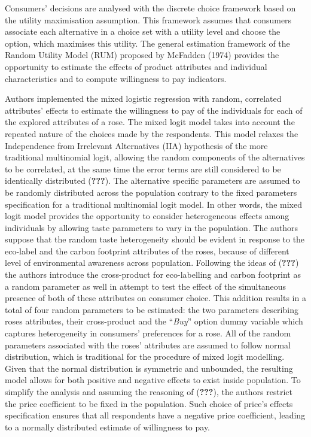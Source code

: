 \documentclass[11pt,]{article}
\begin{document}
Consumers' decisions are analysed with the discrete choice framework
based on the utility maximisation assumption. This framework assumes
that consumers associate each alternative in a choice set with a utility
level and choose the option, which maximises this utility. The general
estimation framework of the Random Utility Model (RUM) proposed by
McFadden (1974) provides the opportunity to estimate the effects of
product attributes and individual characteristics and to compute
willingness to pay indicators.

Authors implemented the mixed logistic regression with random,
correlated attributes' effects to estimate the willingness to pay of the
individuals for each of the explored attributes of a rose. The mixed
logit model takes into account the repeated nature of the choices made
by the respondents. This model relaxes the Independence from Irrelevant
Alternatives (IIA) hypothesis of the more traditional multinomial logit,
allowing the random components of the alternatives to be correlated, at
the same time the error terms are still considered to be identically
distributed ({\textbf{???}}). The alternative specific parameters are
assumed to be randomly distributed across the population contrary to the
fixed parameters specification for a traditional multinomial logit
model. In other words, the mixed logit model provides the opportunity to
consider heterogeneous effects among individuals by allowing taste
parameters to vary in the population. The authors suppose that the
random taste heterogeneity should be evident in response to the
eco-label and the carbon footprint attributes of the roses, because of
different level of environmental awareness across population. Following
the ideas of ({\textbf{???}}) the authors introduce the cross-product
for eco-labelling and carbon footprint as a random parameter as well in
attempt to test the effect of the simultaneous presence of both of these
attributes on consumer choice. This addition results in a total of four
random parameters to be estimated: the two parameters describing roses
attributes, their cross-product and the ``\emph{Buy}'' option dummy
variable which captures heterogeneity in consumers' preferences for a
rose. All of the random parameters associated with the roses' attributes
are assumed to follow normal distribution, which is traditional for the
procedure of mixed logit modelling. Given that the normal distribution
is symmetric and unbounded, the resulting model allows for both positive
and negative effects to exist inside population. To simplify the
analysis and assuming the reasoning of ({\textbf{???}}), the authors
restrict the price coefficient to be fixed in the population. Such
choice of price's effects specification ensures that all respondents
have a negative price coefficient, leading to a normally distributed
estimate of willingness to pay.
\end{document}
